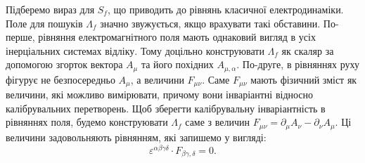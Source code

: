Підберемо вираз для $S_f$, що приводить до рівнянь класичної електродинаміки. Поле для пошуків $\Lambda_f$ значно звужується, якщо врахувати такі обставини. По-перше, рівняння електромагнітного поля мають однаковий вигляд в усіх інерціальних системах відліку. Тому доцільно конструювати $\Lambda_f$ як скаляр за допомогою згорток вектора $A_{\mu}$ та його похідних $A_{\mu,\alpha}$. По-друге, в рівняннях руху фігурує не безпосередньо $A_{\mu}$, а величини $F_{\mu\nu}$. Саме $F_{\mu\nu}$ мають фізичний зміст як величини, які можливо вимірювати, причому вони інваріантні відносно калібрувальних перетворень. Щоб зберегти калібрувальну інваріантність в рівняннях поля, будемо конструювати $\Lambda_f$ саме з величин $F_{\mu\nu}=\partial_{\mu}A_{\nu}-\partial_{\nu}A_{\mu}$. Ці величини задовольняють рівнянням, які запишемо у вигляді:
\begin{equation}\label{eq:Bianchi}
    \varepsilon^{\alpha\beta\gamma\delta}\cdot F_{\beta\gamma,\delta} = 0.
\end{equation}

